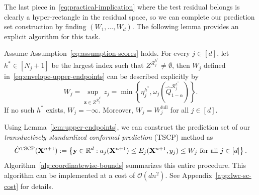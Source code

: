 The last piece in~\eqref{eq:practical-implication} where the test residual belongs is clearly a hyper-rectangle in the residual space, so we can complete our prediction set construction by finding $(W_1,\ldots, W_d)$. The following lemma provides an explicit algorithm for this task.

\begin{lemma}\label{lem:upper-endpoints}
    Assume Assumption~\ref{eq:assumption-scores} holds. For every $j\in [d]$, let $h^* \in [N_j+1]$ be the largest index such that $Z^{\mathcal R_j^{h^*}} \neq \emptyset$, then $W_j$ defined in~\eqref{eq:envelope-upper-endpoints} can be described explicitly by
    \[
    W_j = \sup_{\mathbf z\in Z^{\mathcal R_j^{h^*}}}z_j=\min\left\{\eta_j^{h^*},\omega_j\left( \hat Q^{\mathcal R_j^{h^*}}_{1-\alpha}\right)\right\}.
    \]
    If no such $h^*$ exists, $W_j = -\infty$. Moreover, $W_j = W^\mathrm{full}_j$ for all $j\in [d]$.
\end{lemma}

Using Lemma~\ref{lem:upper-endpoints}, we can construct the prediction set of our \emph{transductively standardized conformal prediction} (TSCP) method as
\begin{equation}\label{eq:TSCP}
\hat C^{\mathrm{TSCP}}(\mathbf X^{n+1})
:=
\left\{\mathbf y\in\mathbb{R}^d:
a_j(\mathbf X^{n+1})
\leq E_j(\mathbf X^{n+1},y_j)\leq W_j
\text{ for all }j\in[d]\right\}.
\end{equation}
Algorithm~\ref{alg:coordinatewise-bounds} summarizes this entire procedure. This algorithm can be implemented at a cost of $\mathcal{O}(dn^2)$. See Appendix~\ref{app:lwc-sc-cost} for details.

